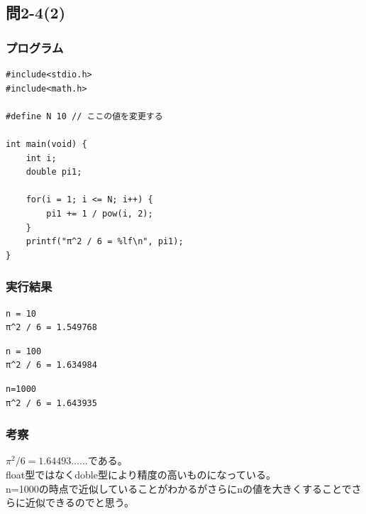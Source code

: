 \documentclass{jarticle}
\begin{document}
\subsection{問2-4(2)\\}
\subsubsection{プログラム\\}
\begin{breakbox}
\begin{verbatim}
#include<stdio.h>
#include<math.h>

#define N 10 // ここの値を変更する

int main(void) { 
    int i;
    double pi1;

    for(i = 1; i <= N; i++) {
        pi1 += 1 / pow(i, 2);
    }
    printf("π^2 / 6 = %lf\n", pi1);
}
\end{verbatim}
\end{breakbox}

\subsubsection{実行結果\\}
\begin{breakbox}
\begin{verbatim}
n = 10
π^2 / 6 = 1.549768
\end{verbatim}
\end{breakbox}

\begin{breakbox}
\begin{verbatim}
n = 100
π^2 / 6 = 1.634984
\end{verbatim}
\end{breakbox}

\begin{breakbox}
\begin{verbatim}
n=1000
π^2 / 6 = 1.643935
\end{verbatim}
\end{breakbox}
\subsubsection{考察\\}
$π^2 / 6 = 1.64493......である。$\\
float型ではなくdoble型により精度の高いものになっている。\\
n=1000の時点で近似していることがわかるがさらにnの値を大きくすることでさらに近似できるのでと思う。\\
\end{document}
